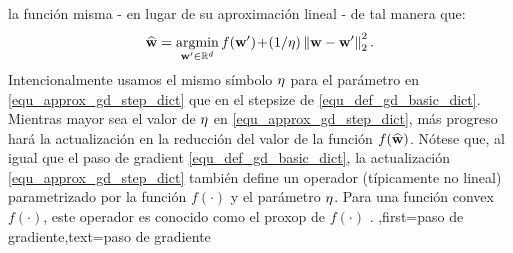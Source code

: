 {{{		la función misma - en lugar de su aproximación lineal - de tal manera que:
		\begin{align} 
		\label{equ_approx_gd_step_dict}
		\widehat{{\bf w}} = \operatorname*{argmin}_{{\bf w}' \in \mathbb{R}^{d}} f({\bf w}')\!+\!(1/\eta)\left\Vert {{\bf w}-{\bf w}'} \right\Vert_{2}^2. 
		\end{align}
		Intencionalmente usamos el mismo símbolo $\eta$ para el parámetro en \eqref{equ_approx_gd_step_dict} 
		que en el \gls{stepsize} de \eqref{equ_def_gd_basic_dict}. Mientras mayor sea el valor de $\eta$ en 
		\eqref{equ_approx_gd_step_dict}, más progreso hará la actualización en la reducción del valor de la función $f(\widehat{{\bf w}})$. 
		Nótese que, al igual que el paso de \gls{gradient}  \eqref{equ_def_gd_basic_dict}, 
		la actualización \eqref{equ_approx_gd_step_dict} también define un operador (típicamente no lineal)  
		parametrizado por la función $f(\cdot)$ y el parámetro $\eta$. Para una función \gls{convex}  
		$f(\cdot)$, este operador es conocido como el \gls{proxop} de $f(\cdot)$ \cite{ProximalMethods}. 
		},first={paso de gradiente},text={paso de gradiente}}
	

}
